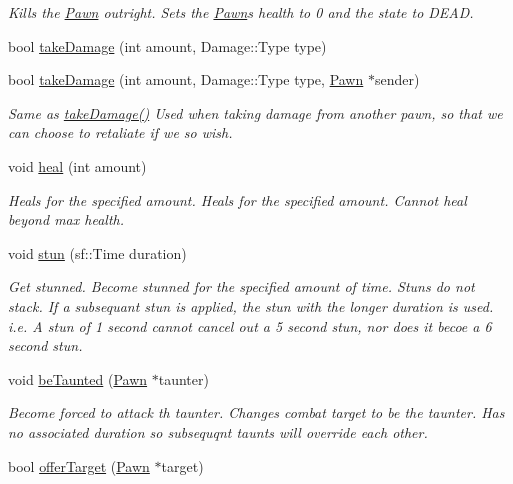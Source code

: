 \begin{DoxyCompactItemize}
\begin{DoxyCompactList}\small\item\em Kills the \hyperlink{class_pawn}{Pawn} outright. Sets the \hyperlink{class_pawn}{Pawn}\textquotesingle{}s health to 0 and the state to D\+E\+A\+D. \end{DoxyCompactList}\item 
bool \hyperlink{class_pawn_a33dbdacc56d2f0728d7485b508b6d28e}{take\+Damage} (int amount, Damage\+::\+Type type)
\item 
bool \hyperlink{class_pawn_a3fe30c95134f87a7b91e3113b7c2c78b}{take\+Damage} (int amount, Damage\+::\+Type type, \hyperlink{class_pawn}{Pawn} $\ast$sender)
\begin{DoxyCompactList}\small\item\em Same as \hyperlink{class_pawn_a33dbdacc56d2f0728d7485b508b6d28e}{take\+Damage()} Used when taking damage from another pawn, so that we can choose to retaliate if we so wish. \end{DoxyCompactList}\item 
void \hyperlink{class_pawn_a26a6eaa626a163283ed66093e17723d6}{heal} (int amount)
\begin{DoxyCompactList}\small\item\em Heals for the specified amount. Heals for the specified amount. Cannot heal beyond max health. \end{DoxyCompactList}\item 
void \hyperlink{class_pawn_a197ec1bbce0624316ff8fe0ec49b3d6e}{stun} (sf\+::\+Time duration)
\begin{DoxyCompactList}\small\item\em Get stunned. Become stunned for the specified amount of time. Stuns do not stack. If a subsequant stun is applied, the stun with the longer duration is used. i.\+e. A stun of 1 second cannot cancel out a 5 second stun, nor does it becoe a 6 second stun. \end{DoxyCompactList}\item 
void \hyperlink{class_pawn_a52ef95ca2a7c516325df5546e8131d08}{be\+Taunted} (\hyperlink{class_pawn}{Pawn} $\ast$taunter)
\begin{DoxyCompactList}\small\item\em Become forced to attack th taunter. Changes combat target to be the taunter. Has no associated duration so subsequqnt taunts will override each other. \end{DoxyCompactList}\item 
bool \hyperlink{class_pawn_aed61c1cf26754757cd4c5cb12421476b}{offer\+Target} (\hyperlink{class_pawn}{Pawn} $\ast$target)

\end{DoxyCompactItemize}
